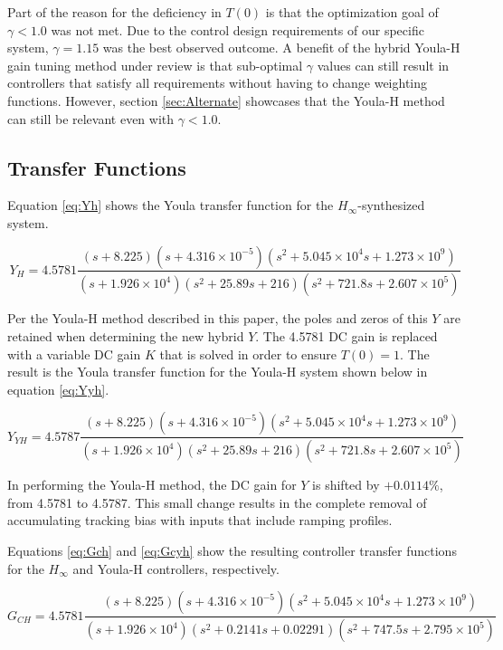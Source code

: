 \documentclass[journal,article,submit,pdftex,moreauthors]{Definitions/mdpi}
\begin{document}
Part of the reason for the deficiency in $T(0)$ is that the optimization goal of $\gamma<1.0$ was not met. Due to the control design requirements of our specific system, $\gamma=1.15$ was the best observed outcome. A benefit of the hybrid Youla-H gain tuning method under review is that sub-optimal $\gamma$ values can still result in controllers that satisfy all requirements without having to change weighting functions. However, section \ref{sec:Alternate} showcases that the Youla-H method can still be relevant even with $\gamma<1.0$.

\subsection{Transfer Functions}
Equation \ref{eq:Yh} shows the Youla transfer function for the $H_\infty$-synthesized system.

\begin{equation} \label{eq:Yh}
Y_{H} = 4.5781\frac{(s+8.225) (s+4.316\times10^{-5}) (s^2 + 5.045\times10^{4}s + 1.273\times10^{9})}{(s+1.926\times10^{4}) (s^2 + 25.89s + 216) (s^2 + 721.8s + 2.607\times10^{5})}
\end{equation}

Per the Youla-H method described in this paper, the poles and zeros of this $Y$ are retained when determining the new hybrid $Y$. The 4.5781 DC gain is replaced with a variable DC gain $K$ that is solved in order to ensure $T(0)=1$. The result is the Youla transfer function for the Youla-H system shown below in equation \ref{eq:Yyh}.

\begin{equation} \label{eq:Yyh}
Y_{YH} = \mathbf{4.5787}\frac{(s+8.225) (s+4.316\times10^{-5}) (s^2 + 5.045\times10^{4}s + 1.273\times10^{9})}{(s+1.926\times10^{4}) (s^2 + 25.89s + 216) (s^2 + 721.8s + 2.607\times10^{5})}
\end{equation}

In performing the Youla-H method, the DC gain for $Y$ is shifted by $+0.0114\%$, from 4.5781 to 4.5787. This small change results in the complete removal of accumulating tracking bias with inputs that include ramping profiles.

Equations \ref{eq:Gch} and \ref{eq:Gcyh} show the resulting controller transfer functions for the $H_\infty$ and Youla-H controllers, respectively.

\begin{equation} \label{eq:Gch}
G_{CH} = 4.5781\frac{(s+8.225) (s+4.316\times10^{-5}) (s^2 + 5.045\times10^{4}s + 1.273\times10^{9})}{(s+1.926\times10^{4}) (s^2 + 0.2141s + 0.02291) (s^2 + 747.5s + 2.795\times10^{5})}
\end{equation}
\end{document}
